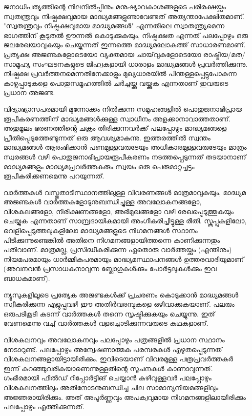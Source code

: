 \vskip 2pt

ജനാധിപത്യത്തിന്റെ നിലനില്‍പ്പിനും മനുഷ്യാവകാശങ്ങളുടെ പരിരക്ഷയ്ക്കും സ്വതന്ത്രവും നിഷ്പക്ഷവുമായ 
മാദ്ധ്യമങ്ങളുണ്ടാവേണ്ടത് അത്യന്താപേക്ഷിതമാണ്. "സ്വതന്ത്രവും നിഷ്പക്ഷവുമായ മാദ്ധ്യമങ്ങള്‍" എന്നതിലെ 
സ്വാതന്ത്ര്യമെന്ന ഭാഗത്തിന് കൂടുതല്‍ ഊന്നല്‍ കൊടുക്കുകയും, നിഷ്പക്ഷത എന്നത് പലപ്പോഴും ഒരു ജലരേഖയാവുകയും 
ചെയ്യുന്നത് ഇന്നത്തെ മാദ്ധ്യമലോകത്ത് സാധാരണമാണ്. പ്രത്യക്ഷ അജണ്ടകളോടെയോ വ്യക്തമായ 
ചായ്‌വുകളോടെയോ രാഷ്ട്രീയ/മത/സാമൂഹ്യ സംഘടനകളുടെ ജിഹ്വകളായി ധാരാളം മാദ്ധ്യമങ്ങള്‍ പ്രവര്‍ത്തിക്കുന്നു. 
നിഷ്പക്ഷ പ്രവര്‍ത്തനമെന്നതിനേക്കാളും മുഖ്യധാരയില്‍ പിന്തള്ളപ്പെട്ടുപോകുന്ന കാഴ്ചപ്പാടുകളെ പൊതുസമൂഹത്തില്‍ 
ചര്‍ച്ചയ്ക്കു വയ്ക്കുക എന്നതാണ് ഇവരുടെ പ്രധാന അജണ്ട.

വിദ്യാഭ്യാസപരമായി മുന്നോക്കം നില്‍ക്കുന്ന സമൂഹങ്ങളില്‍ പൊതുജനാഭിപ്രായ രൂപീകരണത്തിന് മാദ്ധ്യമങ്ങള്‍ക്കുള്ള 
സ്വാധീനം അളക്കാനാവാത്തതാണ്. അതുമൂലം ഭരണത്തിന്റെ ചക്രം തിരിക്കുന്നവര്‍ക്ക് പലപ്പോഴും മാദ്ധ്യമങ്ങളെ 
പ്രീതിപ്പെടുത്തേണ്ടുന്നത് ഒരു ആവശ്യമാകുന്നു. ഇത്തരത്തില്‍ സ്വന്തം മാദ്ധ്യമങ്ങള്‍ ആരംഭിക്കാന്‍ പണമുള്ളവരുടേയും 
അധികാരമുള്ളവരുടേയും മാത്രം സ്വരങ്ങള്‍ വഴി പൊതുജനാഭിപ്രായരൂപീകരണം നടത്തപ്പെടുന്നത് തടയാനാണ് 
മാദ്ധ്യമങ്ങളും മാദ്ധ്യമപ്രവര്‍ത്തകരും സ്വയം ഒരു പെരുമാറ്റച്ചട്ടം രൂപീകരിക്കണമെന്നു പറയുന്നത്.

വാര്‍ത്തകള്‍ വസ്തുതാടിസ്ഥാനത്തിലുള്ള വിവരണങ്ങള്‍ മാത്രമാവുകയും, മാദ്ധ്യമ അജണ്ടകള്‍ 
വാര്‍ത്തകളോടുനുബന്ധിച്ചുള്ള അവലോകനങ്ങളോ, വിശകലങ്ങളോ, നിരീക്ഷണങ്ങളോ, അഭിമുഖങ്ങളോ വഴി 
രേഖപ്പെടുത്തുകയും ചെയ്യുക എന്നതാണ് സാമ്പ്രദായികമായി അംഗീകരിച്ചിട്ടുള്ള രീതി. സ്കൂപ്പുകളിലോ, 
വെളിപ്പെടുത്തലുകളിലോ മാദ്ധ്യമങ്ങളുടെ നിഗമനങ്ങള്‍ സ്ഥാനം പിടിക്കുന്നുണ്ടെങ്കില്‍ അതിനെ നിഗമനങ്ങളായിത്തന്നെ 
കാണിക്കുന്നതും പതിവാണ്. മാത്രമല്ല, പ്രസിദ്ധീകരിക്കുന്ന ഏതൊരു വാര്‍ത്തയ്ക്കും (എന്തിനും) നിയമപരമായും 
ധാര്‍മ്മികപരമായും മാദ്ധ്യമസ്ഥാപനങ്ങള്‍ ഉത്തരവാദിയുമാണ് (അവനവന്‍ പ്രസാധകനാവുന്ന ബ്ലോഗുകള്‍ക്കും 
പോര്‍ട്ടലുകള്‍ക്കും ഇവ ബാധകമാണ്).

ന്യൂസുകളിലൂടെ പ്രത്യേക അജണ്ടകള്‍ക്ക് പ്രചരണം കൊടുക്കാന്‍ മാദ്ധ്യമങ്ങള്‍ സ്വീകരിക്കുന്ന എളുപ്പവഴി ഈ 
അതിര്‍വരമ്പുകളെ ഒഴിവാക്കുകയാണ്. പലരും ഒരുപടികൂടി കടന്ന് വാര്‍ത്തകള്‍ തന്നെ സൃഷ്ടിക്കുകയും ചെയ്യുന്നു. ഇത് 
വേണമെന്നു വച്ച് വാര്‍ത്തകള്‍ വളച്ചൊടിക്കുന്നവരുടെ കഥകളാണ്.

വിശകലനവും അവലോകനവും പലപ്പോഴും പത്രങ്ങളില്‍ പ്രധാന സ്ഥാനം നേടാറുണ്ട്. പലപ്പോഴും അന്വേഷണാത്മക 
പരമ്പരകള്‍ എഴുതപ്പെടുന്നത് വിശകലനങ്ങളായിട്ടായിരിക്കും. ഇവിടെയാണ് വിവരമുള്ള പത്രപ്രവര്‍ത്തകര്‍ ഇന്ന് 
കുറഞ്ഞുവരികയാണെന്നുള്ളതിന്റെ സൂചനകള്‍ കാണാവുന്നത്. ഗംഭീരമായി ഫീല്‍ഡ് റിപ്പോര്‍ട്ടിങ് ചെയ്യാന്‍ 
കഴിവുള്ളവര്‍ പലപ്പോഴും വിശകലനത്തിലും അതിനോടനുബന്ധിച്ച ചില സാമാന്യനിയമങ്ങളിലും അജ്ഞരായിരിക്കും. 
അത് അപൂര്‍ണ്ണവും അപക്വവുമായ നിഗമനങ്ങളിലായിരിക്കും പലപ്പോഴും എത്തിക്കുന്നത്.

